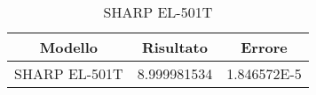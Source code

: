 \begin{table}
	\centering
		\begin{tabular}{lll}
		\toprule
		\multicolumn{1}{c}{Modello}&\multicolumn{1}{c}{Risultato}&\multicolumn{1}{c}{Errore}\\
		\midrule
		SHARP EL-501T&\num{8.999981534}&\num{1.846572E-5}\\
		\bottomrule
	\end{tabular} 


	\caption{SHARP EL-501T}
	\label{tab:SHARPEL-501T}
\end{table}
